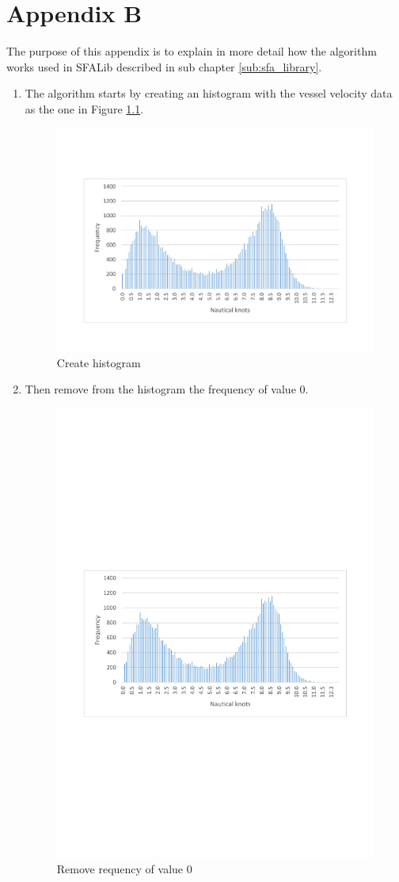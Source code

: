 \chapter{Appendix B} 
\label{appendix:anexo2}

The purpose of this appendix is to explain in more detail how the algorithm works used in SFALib described in sub chapter \ref{sub:sfa_library}.

\begin{enumerate}


\item The algorithm starts by creating an histogram with the vessel velocity data as the one in Figure \ref{fig:app_b_1}. 

\begin{figure}[H]
    \centering
    \includegraphics[trim=0 80 0 80,height=0.45\linewidth]{Chapters/img/hist_vessel2.pdf}
    \caption{Create histogram}
    \label{fig:app_b_1}
\end{figure}

\newpage
\item Then remove from the histogram the frequency of value 0.
\begin{figure}[H]
    \centering
    \includegraphics[trim=250 275 250 300,height=0.5\linewidth]{Chapters/img/hc_2.pdf}
    \caption{Remove requency of value 0}
    \label{fig:app_b_2}
\end{figure}


\end{enumerate}
